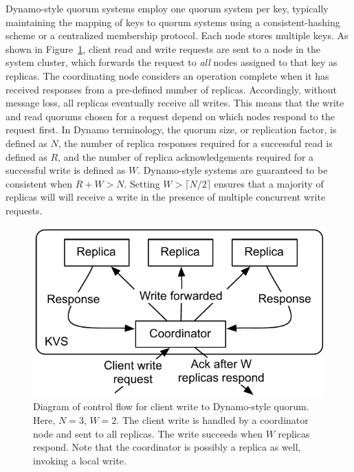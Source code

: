 \documentclass{vldb}
\begin{document}
Dynamo-style quorum systems employ one quorum system per key,
typically maintaining the mapping of keys to quorum systems using a
consistent-hashing scheme or a centralized membership protocol. Each
node stores multiple keys.  As shown in
Figure~\ref{fig:dynamo-quorum}, client read and write requests are
sent to a node in the system cluster, which forwards the request to
\textit{all} nodes assigned to that key as replicas.  The coordinating
node considers an operation complete when it has received responses
from a pre-defined number of replicas.  Accordingly, without message
loss, all replicas eventually receive all writes.  This means that the
write and read quorums chosen for a request depend on which nodes
respond to the request first.  In Dynamo terminology, the quorum size,
or replication factor, is defined as $N$, the number of replica
responses required for a successful read is defined as $R$, and the
number of replica acknowledgements required for a successful write is
defined as $W$. Dynamo-style systems are guaranteed to be consistent
when $R+W > N$.  Setting $W>\lceil N/2 \rceil$ ensures that a majority
of replicas will will receive a write in the presence of multiple
concurrent write requests.

\begin{figure}
\centering
\includegraphics[width=.85\columnwidth]{figs/dynamo-quorum.pdf}
\vspace{-8pt}
\caption{Diagram of control flow for client write to Dynamo-style
  quorum.  Here, $N=3$, $W=2$. The client write is handled by a
  coordinator node and sent to all replicas. The write succeeds when
  $W$ replicas respond.  Note that the coordinator is possibly a
  replica as well, invoking a local write.}
\vspace{-14pt}
\label{fig:dynamo-quorum}
\end{figure}
\end{document}
